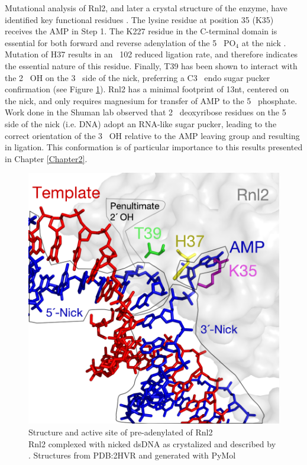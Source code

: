 Mutational analysis of Rnl2, and later a crystal structure of the enzyme, have identified key functional residues \citep{Ho2004, Nandakumar2006,Nandakumar2004a,Yin2003d}. The lysine residue at position 35 (K35) receives the AMP in Step 1. The K227 residue in the C-terminal domain is essential for both forward and reverse adenylation of the 5\textprime~ PO$_4$ at the nick \citep{Viollet2011}. Mutation of H37 results in an ~102 reduced ligation rate, and therefore indicates the essential nature of this residue. Finally, T39 has been shown to interact with the 2\textprime~ OH on the 3\textprime~ side of the nick, preferring a C3\textprime~ endo sugar pucker confirmation (see Figure \ref{fig:Rnl2 Active Site Residues}). Rnl2 has a minimal footprint of 13nt, centered on the nick, and only requires magnesium for transfer of AMP to the 5\textprime~ phosphate. Work done in the Shuman lab \citep{Nandrakumar2006} observed that 2\textprime~ deoxyribose residues on the 5\textprime~ side of the nick (i.e. DNA) adopt an RNA-like sugar pucker, leading to the correct orientation of the 3\textprime~ OH relative to the AMP leaving group and resulting in ligation. This conformation is of particular importance to this results presented in Chapter \ref{Chapter2}.

\begin{figure}[htbp]
	\centering 
	\includegraphics{Figures/Rnl2_Active_Site_Residues.pdf}
	\caption[Active site of T4 RNA Ligase 2 with highlighted residues]
	{
		Structure and active site of pre-adenylated of Rnl2\\[0.25cm]
		Rnl2 complexed with nicked dsDNA as crystalized and described by \citep{Nandakumar2006}. Structures from PDB:2HVR and generated with PyMol
	}
	\label{fig:Rnl2 Active Site Residues}
\end{figure}

